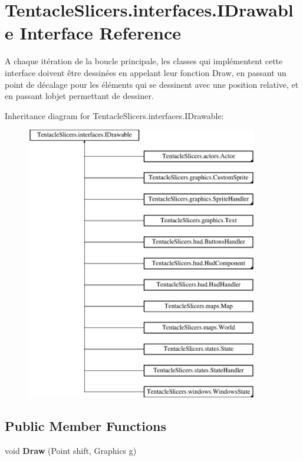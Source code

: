 \hypertarget{interface_tentacle_slicers_1_1interfaces_1_1_i_drawable}{}\section{Tentacle\+Slicers.\+interfaces.\+I\+Drawable Interface Reference}
\label{interface_tentacle_slicers_1_1interfaces_1_1_i_drawable}


A chaque itération de la boucle principale, les classes qui implémentent cette interface doivent être dessinées en appelant leur fonction Draw, en passant un point de décalage pour les éléments qui se dessinent avec une position relative, et en passant l\textquotesingle{}objet permettant de dessiner.  


Inheritance diagram for Tentacle\+Slicers.\+interfaces.\+I\+Drawable\+:\begin{figure}[H]
\begin{center}
\leavevmode
\includegraphics[height=12.000000cm]{interface_tentacle_slicers_1_1interfaces_1_1_i_drawable}
\end{center}
\end{figure}
\subsection*{Public Member Functions}
\begin{DoxyCompactItemize}
\item 
\mbox{\label{interface_tentacle_slicers_1_1interfaces_1_1_i_drawable_a42f4bdc950f53dcf33bc05ee170901b6}} 
void {\bfseries Draw} (Point shift, Graphics g)
\end{DoxyCompactItemize}


